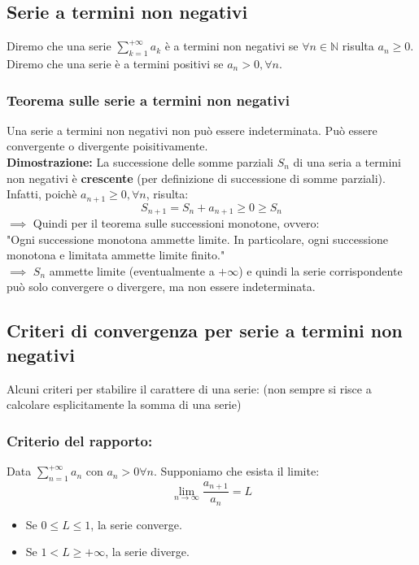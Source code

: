 \documentclass[../main.tex]{subfiles}
\begin{document}
\subsection{Serie a termini non negativi}
Diremo che una serie $\sum_{k=1}^{+\infty}a_k$ è a termini non negativi se
$\forall n\in \mathbb{N}$ risulta $a_n \geq 0$.\\ Diremo che una serie è a
termini positivi se $a_n>0, \forall n$.

\subsubsection{Teorema sulle serie a termini non negativi}
Una serie a termini non negativi non può essere indeterminata. Può essere
convergente o divergente poisitivamente.\\ \textbf{Dimostrazione:} La
successione delle somme parziali $S_n$ di una seria a termini non negativi è
\textbf{crescente} (per definizione di successione di somme parziali).\\
Infatti, poichè $a_{n+1}\geq 0, \forall n$, risulta:
\[
    S_{n+1} = S_n + a_{n+1} \geq 0 \geq S_n
\]
$\implies$ Quindi per il teorema sulle successioni monotone, ovvero:\\
"Ogni successione monotona ammette limite. In particolare, ogni successione monotona e limitata ammette limite finito."\\
$\implies$ $S_n$ ammette limite (eventualmente a $+\infty$) e quindi la serie corrispondente può solo convergere o divergere, ma non essere indeterminata.

\subsection{Criteri di convergenza per serie a termini non negativi}
Alcuni criteri per stabilire il carattere di una serie: (non sempre si risce a
calcolare esplicitamente la somma di una serie)

\subsubsection{Criterio del rapporto:} Data $\sum_{n=1}^{+\infty}a_n$ con $a_n > 0 \forall n$. Supponiamo che esista
il limite:
\[
    \lim_{n\to\infty}\frac{a_{n+1}}{a_n} = L
\]
\begin{itemize}
    \item Se $0\leq L \leq 1$, la serie converge.
    \item Se $1 < L \geq +\infty$, la serie diverge.
\end{itemize}
\end{document}

